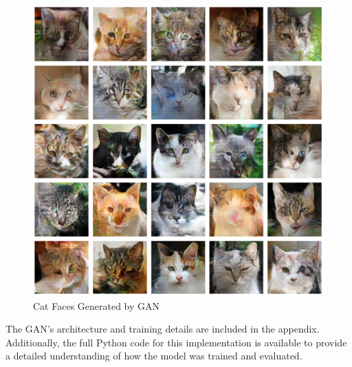 \begin{figure}[H]
    \centering
    \includegraphics[width=0.8\linewidth]{./Images/apply_new_dataset.jpg}
    \caption{Cat Faces Generated by GAN}
    \label{fig:cat_faces_generated}
\end{figure}

The GAN’s architecture and training details are included in the appendix. Additionally, the full Python code for this implementation is available to provide a detailed understanding of how the model was trained and evaluated.